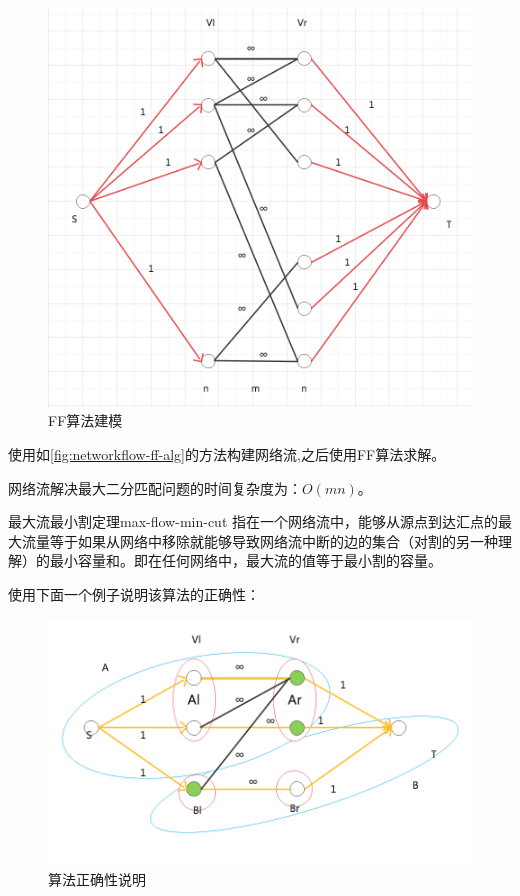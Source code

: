 \begin{figure}[htb]
	\centering
	\includegraphics[scale=0.6]{image/networkflow2.png}
	\caption{FF算法建模}\label{fig:networkflow-ff-alg}
\end{figure}

使用如\autoref{fig:networkflow-ff-alg}的方法构建网络流,之后使用FF算法求解。

网络流解决最大二分匹配问题的时间复杂度为：\(O(mn)\)。

\begin{theorem}{最大流最小割定理}{max-flow-min-cut}
	指在一个网络流中，能够从源点到达汇点的最大流量等于如果从网络中移除就能够导致网络流中断的边的集合（对割的另一种理解）的最小容量和。即在任何网络中，最大流的值等于最小割的容量。
\end{theorem}

使用下面一个例子说明该算法的正确性：
\begin{figure}[htb]
	\centering
	\includegraphics[scale=0.6]{image/networkflow3.png}
	\caption{算法正确性说明}\label{fig:networkflow-alg-correctness}
\end{figure}

